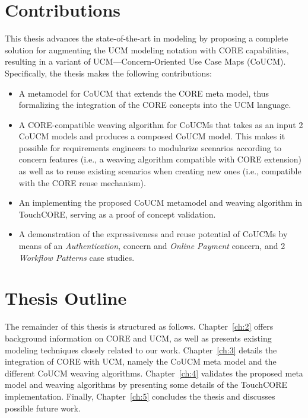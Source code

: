 \section{Contributions}

This thesis advances the state-of-the-art in modeling by proposing a complete solution for augmenting the UCM modeling notation with CORE capabilities, resulting in a variant of UCM---Concern-Oriented Use Case Maps (CoUCM). Specifically, the thesis makes the following contributions:

\begin{itemize}

\item A metamodel for CoUCM that extends the CORE meta model, thus formalizing the integration of the CORE concepts into the UCM language.

\item A CORE-compatible weaving algorithm for CoUCMs that takes as an input 2 CoUCM models and produces a composed CoUCM model. This makes it possible for requirements engineers to modularize scenarios according to concern features (i.e., a weaving algorithm compatible with CORE extension) as well as to reuse existing scenarios when creating new ones (i.e., compatible with the CORE reuse mechanism).

\item An implementing the proposed CoUCM metamodel and weaving algorithm in TouchCORE, serving as a proof of concept validation.

\item A demonstration of the expressiveness and reuse potential of CoUCMs by means of an \emph{Authentication}, concern and \emph{Online Payment} concern, and 2 \emph{Workflow Patterns} case studies.

\end{itemize}

\section{Thesis Outline}

The remainder of this thesis is structured as follows. Chapter~\ref{ch:2} offers background information on CORE and UCM, as well as presents existing modeling techniques closely related to our work. Chapter~\ref{ch:3} details the integration of CORE with UCM, namely the CoUCM meta model and the different CoUCM weaving algorithms. Chapter~\ref{ch:4} validates the proposed meta model
and weaving algorithms by presenting some details of the TouchCORE implementation. Finally, Chapter~\ref{ch:5} concludes the thesis and discusses possible future work.
